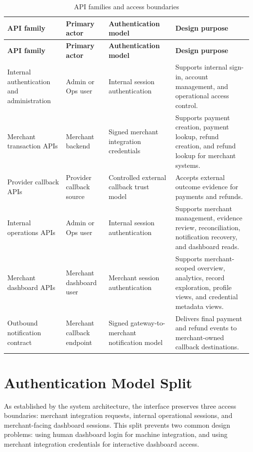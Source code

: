 \begin{longtable}{L{0.17\textwidth}L{0.19\textwidth}L{0.20\textwidth}L{0.34\textwidth}}
\caption{API families and access boundaries}\\
\toprule
\textbf{API family} & \textbf{Primary actor} & \textbf{Authentication model} & \textbf{Design purpose} \\
\midrule
\endfirsthead
\toprule
\textbf{API family} & \textbf{Primary actor} & \textbf{Authentication model} & \textbf{Design purpose} \\
\midrule
\endhead
Internal authentication and administration & Admin or Ops user & Internal session authentication & Supports internal sign-in, account management, and operational access control. \\
\bodyrowrule
Merchant transaction APIs & Merchant backend & Signed merchant integration credentials & Supports payment creation, payment lookup, refund creation, and refund lookup for merchant systems. \\
\bodyrowrule
Provider callback APIs & Provider callback source & Controlled external callback trust model & Accepts external outcome evidence for payments and refunds. \\
\bodyrowrule
Internal operations APIs & Admin or Ops user & Internal session authentication & Supports merchant management, evidence review, reconciliation, notification recovery, and dashboard reads. \\
\bodyrowrule
Merchant dashboard APIs & Merchant dashboard user & Merchant session authentication & Supports merchant-scoped overview, analytics, record exploration, profile views, and credential metadata views. \\
\bodyrowrule
Outbound notification contract & Merchant callback endpoint & Signed gateway-to-merchant notification model & Delivers final payment and refund events to merchant-owned callback destinations. \\
\bottomrule
\end{longtable}

\section{Authentication Model Split}

As established by the system architecture, the interface preserves three access
boundaries: merchant integration requests, internal operational sessions, and
merchant-facing dashboard sessions. This split prevents two common design
problems: using human dashboard login for machine integration, and using
merchant integration credentials for interactive dashboard access.

